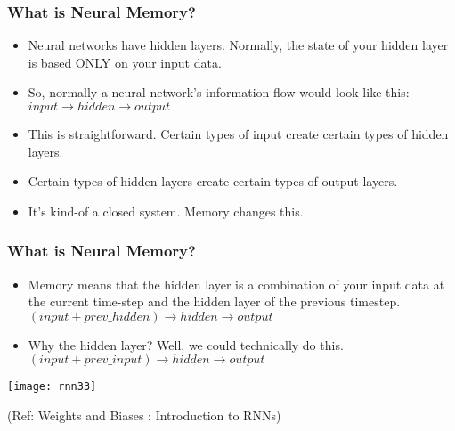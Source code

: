 \begin{frame}[fragile] \frametitle{What is Neural Memory?}

\begin{itemize}
\item Neural networks have hidden layers. Normally, the state of your hidden layer is based ONLY on your input data. 
\item So, normally a neural network's information flow would look like this:
$input \rightarrow hidden  \rightarrow  output$
\item This is straightforward. Certain types of input create certain types of hidden layers. 
\item Certain types of hidden layers create certain types of output layers. 
\item It's kind-of a closed system. Memory changes this. 
\end{itemize}
\end{frame}


\begin{frame}[fragile] \frametitle{What is Neural Memory?}
\begin{itemize}
\item Memory means that the hidden layer is a combination of your input data at the current time-step and the hidden layer of the previous timestep.
$ (input + prev\_hidden) \rightarrow hidden \rightarrow output$
\item Why the hidden layer? Well, we could technically do this. 
$(input + prev\_input) \rightarrow hidden \rightarrow output$
\end{itemize}

\begin{center}
\texttt{[image: rnn33]}

{\tiny (Ref: Weights and Biases : Introduction to RNNs)}
\end{center}


\end{frame}


